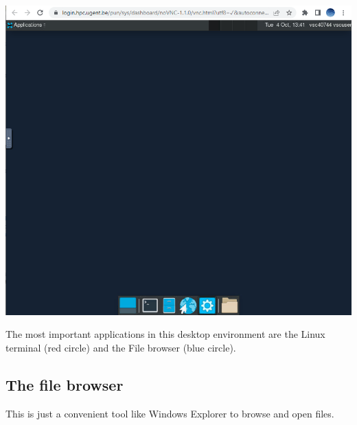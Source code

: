 \documentclass[a4paper]{article}
\begin{document}
%
\begin{center}
	\includegraphics[scale=.4]{desktop}
\end{center}
%
The most important applications in this desktop environment are the Linux terminal (red circle) and the File browser (blue circle).
%
\subsection{The file browser}
%
\par
This is just a convenient tool like Windows Explorer to browse and open files.
%
\end{document}
